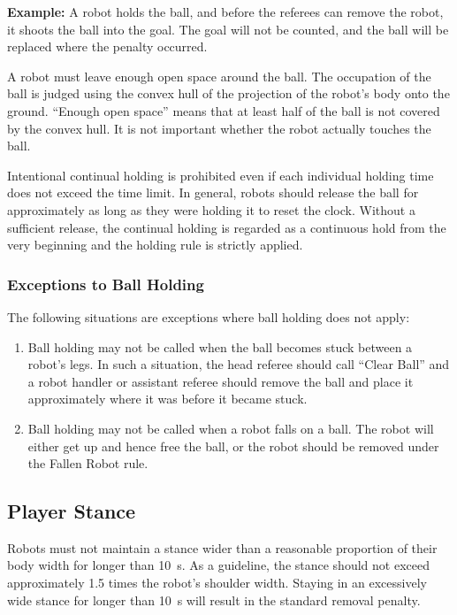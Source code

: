 \textbf{Example:} A robot holds the ball, and before the referees can remove the robot, it shoots the ball into the goal. The goal will not be counted, and the ball will be replaced where the penalty occurred.

A robot must leave enough open space around the ball. The occupation of the ball is judged using the convex hull of the projection of the robot's body onto the ground. ``Enough open space'' means that at least half of the ball is not covered by the convex hull. It is not important whether the robot actually touches the ball.

Intentional continual holding is prohibited even if each individual holding time does not exceed the time limit. In general, robots should release the ball for approximately as long as they were holding it to reset the clock. Without a sufficient release, the continual holding is regarded as a continuous hold from the very beginning and the holding rule is strictly applied.

\subsubsection{Exceptions to Ball Holding}
\label{sec:ball_holding_exceptions}

The following situations are exceptions where ball holding does not apply:
\begin{enumerate}
  \item Ball holding may not be called when the ball becomes stuck between a robot's legs. In such a situation, the head referee should call ``Clear Ball'' and a robot handler or assistant referee should remove the ball and place it approximately where it was before it became stuck.
  \item Ball holding may not be called when a robot falls on a ball. The robot will either get up and hence free the ball, or the robot should be removed under the Fallen Robot rule.
\end{enumerate}

\subsection{Player Stance}
\label{sec:player_stance}

Robots must not maintain a stance wider than a reasonable proportion of their body width for longer than \qty{10}{\second}. As a guideline, the stance should not exceed approximately 1.5 times the robot's shoulder width. Staying in an excessively wide stance for longer than \qty{10}{\second} will result in the standard removal penalty. 

